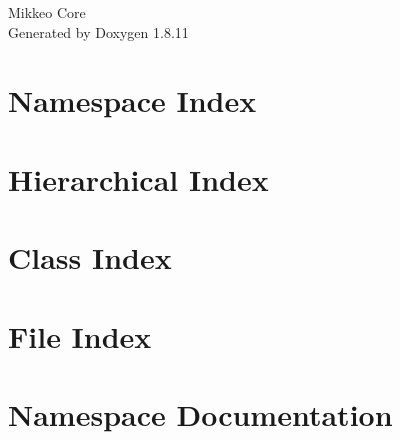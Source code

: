 \documentclass[twoside]{book}
\newcommand{\+}{\discretionary{\mbox{\scriptsize$\hookleftarrow$}}{}{}}
\newcommand{\clearemptydoublepage}{%
  \newpage{\pagestyle{empty}\cleardoublepage}%
}
\begin{document}
\hypersetup{pageanchor=false,
             bookmarksnumbered=true,
             pdfencoding=unicode
            }
\begin{titlepage}
\vspace*{7cm}
\begin{center}%
{\Large Mikkeo Core }\\
\vspace*{1cm}
{\large Generated by Doxygen 1.8.11}\\
\end{center}
\end{titlepage}
\clearemptydoublepage
\tableofcontents
\clearemptydoublepage
{}
\hypersetup{pageanchor=true}

\chapter{Namespace Index}

\chapter{Hierarchical Index}

\chapter{Class Index}

\chapter{File Index}

\chapter{Namespace Documentation}






\end{document}
